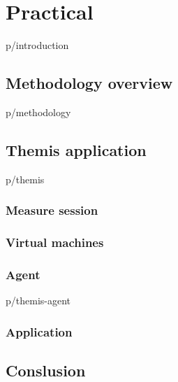 \documentclass[12pt,oneside,a4paper]{report} %
\begin{document}
\part{Practical}
	{p/introduction}
	\chapter{Methodology overview}
	{p/methodology}

	\chapter{Themis application}
		{p/themis}
		\section{Measure session}

		\section{Virtual machines}

		\section{Agent}
		{p/themis-agent}

		\section{Application}


		


	\chapter{Conslusion}

\printglossary[type=acronym,title=List of Abbreviations,toctitle=List of Abbreviations]

\newpage
{} \label{listoffig}
\listoffigures

\newpage
{} \label{listoftab}
\listoftables
\cleardoublepage

{}

\end{document}
